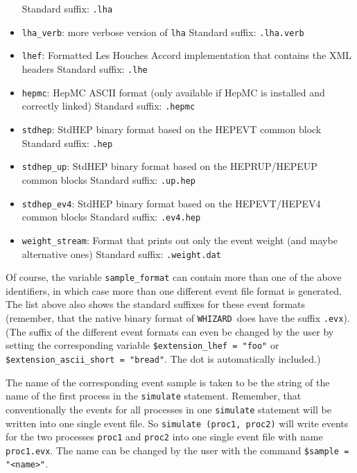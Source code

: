 \documentclass[12pt]{book}
\newcommand{\ttt}[1]{\texttt{#1}}
\newcommand{\whizard}{\ttt{WHIZARD}}
\begin{document}
\begin{itemize}
  Standard suffix: \ttt{.lha}
\item \ttt{lha\_verb}: more verbose version of \ttt{lha} \newline
  Standard suffix: \ttt{.lha.verb}
\item \ttt{lhef}: Formatted Les Houches Accord implementation that
  contains the XML headers \newline
  Standard suffix: \ttt{.lhe}
\item \ttt{hepmc}: HepMC ASCII format (only available if HepMC is
  installed and correctly linked) \newline
  Standard suffix: \ttt{.hepmc}
\item \ttt{stdhep}: StdHEP binary format based on the HEPEVT common
  block
  \newline
  Standard suffix: \ttt{.hep}
\item \ttt{stdhep\_up}: StdHEP binary format based on the HEPRUP/HEPEUP
  common blocks
  \newline
  Standard suffix: \ttt{.up.hep}
\item \ttt{stdhep\_ev4}: StdHEP binary format based on the HEPEVT/HEPEV4
  common blocks
  \newline
  Standard suffix: \ttt{.ev4.hep}
\item \ttt{weight\_stream}: Format that prints out only the event
  weight (and maybe alternative ones) \newline
  Standard suffix: \ttt{.weight.dat}
\end{itemize}
Of course, the variable \ttt{sample\_format} can contain more than one
of the above identifiers, in which case more  than one different event
file format is generated. The list above also shows the standard
suffixes for these event formats (remember, that the native binary
format of \whizard\ does have the suffix \ttt{.evx}). (The suffix of
the different event formats can even be changed by the user by setting
the corresponding variable \ttt{\$extension\_lhef = "foo"} or
\ttt{\$extension\_ascii\_short = "bread"}. The dot is automatically
included.)

The name of the corresponding event sample is taken to be the string
of the name of the first process in the \ttt{simulate}
statement. Remember, that conventionally the events for all processes
in one \ttt{simulate} statement will be written into one single event
file. So \ttt{simulate (proc1, proc2)} will write events for the two
processes \ttt{proc1} and \ttt{proc2} into one single event file with
name \ttt{proc1.evx}. The name can be changed by the user with the
command \ttt{\$sample = "<name>"}.
\end{document}
